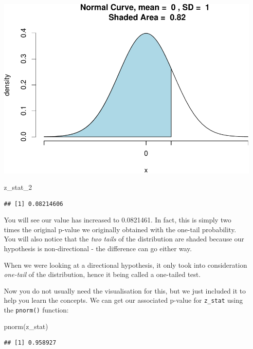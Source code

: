 \documentclass[
]{book}
\newenvironment{Shaded}{\begin{snugshade}}{\end{snugshade}}
\newcommand{\FunctionTok}[1]{\textcolor[rgb]{0.00,0.00,0.00}{#1}}
\newcommand{\NormalTok}[1]{#1}
\begin{document}
\includegraphics{06-hypotheses_files/figure-latex/unnamed-chunk-30-1.pdf}

\begin{Shaded}
\begin{Highlighting}[]
\NormalTok{z\_stat\_2 }
\end{Highlighting}
\end{Shaded}

\begin{verbatim}
## [1] 0.08214606
\end{verbatim}

You will see our value has increased to 0.0821461. In fact, this is simply two times the original p-value we originally obtained with the one-tail probability. You will also notice that the \emph{two tails} of the distribution are shaded because our hypothesis is non-directional - the difference can go either way.

When we were looking at a directional hypothesis, it only took into consideration \emph{one-tail} of the distribution, hence it being called a one-tailed test.

Now you do not usually need the visualisation for this, but we just included it to help you learn the concepts. We can get our associated p-value for \texttt{z\_stat} using the \texttt{pnorm()} function:

\begin{Shaded}
\begin{Highlighting}[]
\FunctionTok{pnorm}\NormalTok{(z\_stat)}
\end{Highlighting}
\end{Shaded}

\begin{verbatim}
## [1] 0.958927
\end{verbatim}
\end{document}
